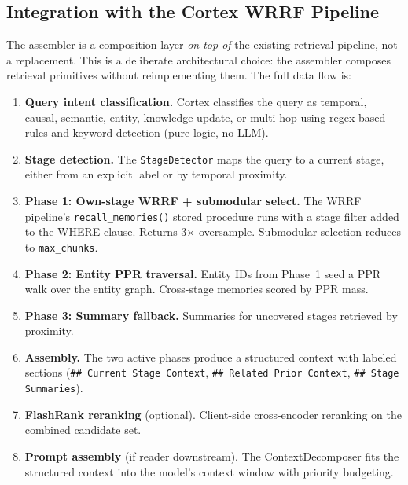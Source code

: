 \documentclass[11pt]{article}
\begin{document}
\subsection{Integration with the Cortex WRRF Pipeline}
\label{sec:integration}

The assembler is a composition layer \emph{on top of} the existing
retrieval pipeline, not a replacement.  This is a deliberate
architectural choice: the assembler composes retrieval primitives
without reimplementing them.  The full data flow is:

\begin{enumerate}
  \item \textbf{Query intent classification.}  Cortex classifies the
    query as temporal, causal, semantic, entity, knowledge-update, or
    multi-hop using regex-based rules and keyword detection (pure
    logic, no LLM).

  \item \textbf{Stage detection.}  The \texttt{StageDetector} maps
    the query to a current stage, either from an explicit label or by
    temporal proximity.

  \item \textbf{Phase 1: Own-stage WRRF + submodular select.}  The
    WRRF pipeline's \texttt{recall\_memories()} stored procedure runs
    with a stage filter added to the WHERE clause.  Returns
    3$\times$ oversample.  Submodular selection reduces to
    \texttt{max\_chunks}.

  \item \textbf{Phase 2: Entity PPR traversal.}  Entity IDs from
    Phase~1 seed a PPR walk over the entity graph.  Cross-stage
    memories scored by PPR mass.

  \item \textbf{Phase 3: Summary fallback.}  Summaries for uncovered
    stages retrieved by proximity.

  \item \textbf{Assembly.}  The two active phases produce a structured
    context with labeled sections (\texttt{\#\# Current Stage Context},
    \texttt{\#\# Related Prior Context},
    \texttt{\#\# Stage Summaries}).

  \item \textbf{FlashRank reranking} (optional).  Client-side
    cross-encoder reranking on the combined candidate set.

  \item \textbf{Prompt assembly} (if reader downstream).  The
    ContextDecomposer fits the structured context into the model's
    context window with priority budgeting.
\end{enumerate}
\end{document}
